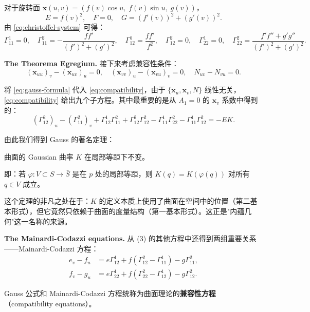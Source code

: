 \begin{Example}\label{ex:christoffel-revolution}
对于旋转面 $\mathbf{x}(u,v) = (f(v)\cos u,\; f(v)\sin u,\; g(v))$，
\[
E = f(v)^2,\quad F = 0,\quad G = (f'(v))^2 + (g'(v))^2.
\]
由 \cref{eq:christoffel-system} 可得：
\[
\Gamma_{11}^1 = 0,\quad \Gamma_{11}^2 = -\frac{ff'}{(f')^2+(g')^2},\quad
\Gamma_{12}^1 = \frac{ff'}{f^2},\quad \Gamma_{12}^2 = 0,\quad
\Gamma_{22}^1 = 0,\quad \Gamma_{22}^2 = \frac{f'f''+g'g''}{(f')^2+(g')^2}.
\]
\end{Example}

\textbf{The Theorema Egregium.} 接下来考虑兼容性条件：
\[
(\mathbf{x}_{uu})_v - (\mathbf{x}_{uv})_u = 0,\quad
(\mathbf{x}_{vv})_u - (\mathbf{x}_{vu})_v = 0,\quad
N_{uv} - N_{vu} = 0.
\label{eq:compatibility}
\]

将 \cref{eq:gauss-formula} 代入 \cref{eq:compatibility}，由于 $\{\mathbf{x}_u, \mathbf{x}_v, N\}$ 线性无关，\cref{eq:compatibility} 给出九个子方程。其中最重要的是从 $A_1 = 0$ 的 $\mathbf{x}_v$ 系数中得到的：
\[
(\Gamma_{12}^2)_u - (\Gamma_{11}^2)_v + \Gamma_{12}^1\Gamma_{11}^2 + \Gamma_{12}^2\Gamma_{12}^2 - \Gamma_{11}^1\Gamma_{22}^2 - \Gamma_{11}^1\Gamma_{12}^2 = -EK.
\label{eq:gauss-equation}
\]

由此我们得到 Gauss 的著名定理：

\begin{Theorem}\label{theorema-egregium}
曲面的 Gaussian 曲率 $K$ 在局部等距下不变。
\end{Theorem}

即：若 $\varphi: V \subset S \to \bar{S}$ 是在 $p$ 处的局部等距，则 $K(q) = K(\varphi(q))$ 对所有 $q \in V$ 成立。

这个定理的非凡之处在于：$K$ 的定义本质上使用了曲面在空间中的位置（第二基本形式），但它竟然只依赖于曲面的度量结构（第一基本形式）。这正是"内蕴几何"这一名称的来源。

\textbf{The Mainardi-Codazzi equations.} 从 (3) 的其他方程中还得到两组重要关系——Mainardi-Codazzi 方程：
\[
\begin{aligned}
e_v - f_u &= e\Gamma_{12}^1 + f(\Gamma_{12}^2 - \Gamma_{11}^1) - g\Gamma_{11}^2,\label{eq:mainardi-codazzi-1}\\
f_v - g_u &= e\Gamma_{22}^1 + f(\Gamma_{22}^2 - \Gamma_{12}^1) - g\Gamma_{12}^2.\label{eq:mainardi-codazzi-2}
\end{aligned}
\]

Gauss 公式和 Mainardi-Codazzi 方程统称为曲面理论的\textbf{兼容性方程}（compatibility equations）。

